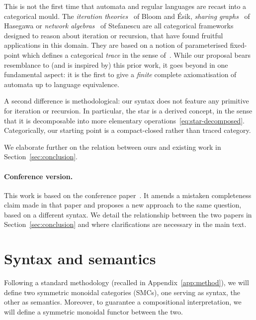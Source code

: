 \documentclass{lmcs}
\theoremstyle{plain}\newtheorem{satz}[thm]{Satz} %
\begin{document}
This is not the first time that automata and regular languages are recast into a categorical mould. The \emph{iteration theories}~\cite{bloom1993iteration} of Bloom and {\'E}sik, \emph{sharing graphs}~\cite{Hasegawa97recursionfrom} of Hasegawa or \emph{network algebras}~\cite{stefanescu2000network} of Stefanescu are all categorical frameworks designed to reason about iteration or recursion, that have found fruitful applications in this domain. They are based on a notion of parameterised fixed-point  which defines a categorical \emph{trace} in the sense of~\cite{Joyal_tracedcategories}. While our proposal bears resemblance to (and is inspired by) this prior work, it goes beyond in one fundamental aspect: it is the first to give a \emph{finite} complete axiomatisation of automata up to language equivalence.

A second difference is methodological: our syntax does not feature any primitive for iteration or recursion. In particular, the star is a derived concept, in the sense that it is decomposable into more elementary operations~\eqref{eq:star-decomposed}. Categorically, our starting point is a compact-closed rather than  traced category.

We elaborate further on the relation between ours and existing work in Section~\ref{sec:conclusion}.

\paragraph{Conference version.} This work is based on the conference paper~\cite{piedeleu2021string}. It amends a mistaken completeness claim made in that paper and proposes a new approach to the same question, based on a different syntax. We detail the relationship between the two papers in Section~\ref{sec:conclusion} and where clarifications are necessary in the main text.



\section{Syntax and semantics}\label{sec:syntax-semantics}

Following a standard methodology (recalled in Appendix~\ref{app:method}), we will define two symmetric monoidal categories (SMCs), one serving as syntax, the other as semantics. Moreover, to guarantee a compositional interpretation, we will define a symmetric monoidal functor between the two.
\end{document}
